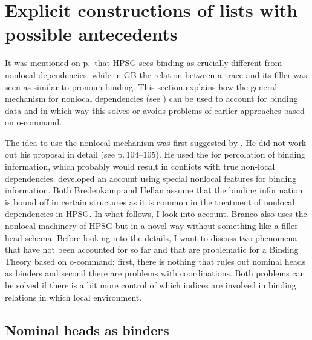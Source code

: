 \documentclass[output=paper,biblatex,babelshorthands,newtxmath,draftmode,colorlinks,citecolor=brown]{langscibook}
\begin{document}
\section{Explicit constructions of lists with possible antecedents}
\label{sec-bt-nonlocal}

It was mentioned on p.\,\pageref{page-traces-binding} that HPSG sees binding as crucially different from nonlocal
dependencies: while in GB the relation between a trace and its filler was seen as similar to pronoun
binding. This section explains how the general mechanism for nonlocal dependencies (see
) can be used to account for binding data and in which way this solves or
avoids problems of earlier approaches based on o-command. 

The idea to use the nonlocal mechanism was first suggested by
\citet[Section~7.2.3]{Bredenkamp96a}. He did not work out his proposal in detail (see 
p.\,104--105). He used the \slashf for percolation of binding information, which probably would
result in conflicts with true non-local dependencies. \citet{Hellan2005a} developed an account using
special nonlocal features for binding information. Both Bredenkamp and Hellan assume that the
binding information is bound off in certain structures as it is common in the treatment of nonlocal
dependencies in HPSG. In what follows, I look into  account. Branco also
uses the nonlocal machinery of HPSG but in a novel way without something like a filler-head
schema. Before looking into the details, I want to discuss two phenomena that have not been
accounted for so far and that are problematic for a Binding Theory based on o-command: first, there
is nothing that rules out nominal heads as binders and second there are problems with
coordinations. Both problems can be solved if there is a bit more control of which indices are
involved in binding relations in which local environment.


\subsection{Nominal heads as binders}
\label{sec-nominal-heads-as-binders}

\end{document}
